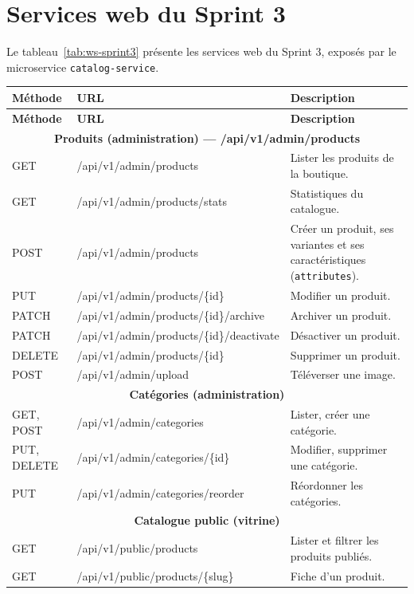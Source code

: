 \section{Services web du Sprint 3}
Le tableau~\ref{tab:ws-sprint3} présente les services web du Sprint 3, exposés par le microservice \texttt{catalog-service}.
\renewcommand{\arraystretch}{1.15}
\setlength{\tabcolsep}{4pt}
\begin{longtable}{|p{1.5cm}|p{6.8cm}|p{6.2cm}|}
\hline
\textbf{Méthode} & \textbf{URL} & \textbf{Description} \\
\hline
\endfirsthead
\hline
\textbf{Méthode} & \textbf{URL} & \textbf{Description} \\
\hline
\endhead
\multicolumn{3}{|c|}{\textbf{Produits (administration) --- /api/v1/admin/products}} \\
\hline
GET & /api/v1/admin/products & Lister les produits de la boutique. \\
\hline
GET & /api/v1/admin/products/stats & Statistiques du catalogue. \\
\hline
POST & /api/v1/admin/products & Créer un produit, ses variantes et ses caractéristiques (\texttt{attributes}). \\
\hline
PUT & /api/v1/admin/products/\{id\} & Modifier un produit. \\
\hline
PATCH & /api/v1/admin/products/\{id\}/archive & Archiver un produit. \\
\hline
PATCH & /api/v1/admin/products/\{id\}/deactivate & Désactiver un produit. \\
\hline
DELETE & /api/v1/admin/products/\{id\} & Supprimer un produit. \\
\hline
POST & /api/v1/admin/upload & Téléverser une image. \\
\hline
\multicolumn{3}{|c|}{\textbf{Catégories (administration)}} \\
\hline
GET, POST & /api/v1/admin/categories & Lister, créer une catégorie. \\
\hline
PUT, DELETE & /api/v1/admin/categories/\{id\} & Modifier, supprimer une catégorie. \\
\hline
PUT & /api/v1/admin/categories/reorder & Réordonner les catégories. \\
\hline
\multicolumn{3}{|c|}{\textbf{Catalogue public (vitrine)}} \\
\hline
GET & /api/v1/public/products & Lister et filtrer les produits publiés. \\
\hline
GET & /api/v1/public/products/\{slug\} & Fiche d'un produit. \\

\end{longtable}
